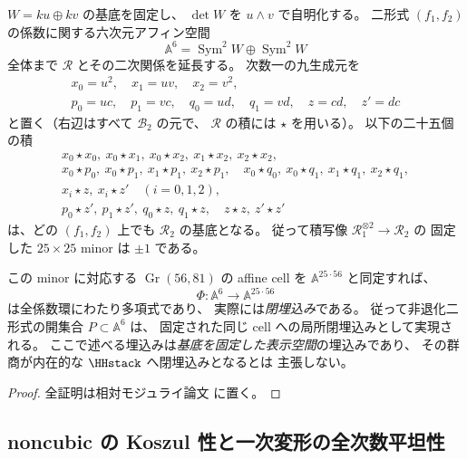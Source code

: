 \begin{proposition}
\label{prop:noncubic-grassmann-explicit-cell}
$W=ku\oplus kv$ の基底を固定し、
$\det W$ を $u\wedge v$ で自明化する。
二形式 $(f_1,f_2)$ の係数に関する六次元アフィン空間
\[
 \mathbb A^6=\operatorname{Sym}^2W\oplus\operatorname{Sym}^2W
\]
全体まで $\mathcal R$ とその二次関係を延長する。
次数一の九生成元を
\[
 \begin{gathered}
 x_0=u^2,\quad x_1=uv,\quad x_2=v^2,\\
 p_0=uc,\quad p_1=vc,\quad q_0=ud,\quad q_1=vd,\quad z=cd,\quad z'=dc
 \end{gathered}
 \tag{NC-9}\label{eq:noncubic-nine-generators}
\]
と置く（右辺はすべて $\mathcal B_2$ の元で、
$\mathcal R$ の積には $\star$ を用いる）。
以下の二十五個の積
\[
\begin{gathered}
 x_0\star x_0,\ x_0\star x_1,\ x_0\star x_2,\
 x_1\star x_2,\ x_2\star x_2,\\
 x_0\star p_0,\ x_0\star p_1,\
 x_1\star p_1,\ x_2\star p_1,\quad
 x_0\star q_0,\ x_0\star q_1,\
 x_1\star q_1,\ x_2\star q_1,\\
 x_i\star z,\ x_i\star z'\quad(i=0,1,2),\\
 p_0\star z',\ p_1\star z',\
 q_0\star z,\ q_1\star z,\quad
 z\star z,\ z'\star z'
\end{gathered}
\tag{NC-25}\label{eq:noncubic-25-pivots}
\]
は、どの $(f_1,f_2)$ 上でも $\mathcal R_2$ の基底となる。
従って積写像 $\mathcal R_1^{\otimes2}\to\mathcal R_2$ の
固定した $25\times25$ minor は $\pm1$ である。

この minor に対応する
$\operatorname{Gr}(56,81)$ の affine cell を
$\mathbb A^{25\cdot56}$ と同定すれば、
\[
 \Phi:\mathbb A^6\longrightarrow\mathbb A^{25\cdot56}
 \tag{NC-cell}\label{eq:noncubic-cell-map}
\]
は全係数環にわたり多項式であり、
実際には\emph{閉埋込み}である。
従って非退化二形式の開集合 $P\subset\mathbb A^6$ は、
固定された同じ cell への局所閉埋込みとして実現される。
ここで述べる埋込みは\emph{基底を固定した表示空間}の埋込みであり、
その群商が内在的な $\HHstack$ へ閉埋込みとなるとは
主張しない。
\end{proposition}
\begin{proof}
全証明は相対モジュライ論文 \cite[\texttt{noncubic_stack}]{QuadricModuli2026} に置く。
\end{proof}

\subsection{noncubic の Koszul 性と一次変形の全次数平坦性}
\label{subsec:noncubic-koszul-infinitesimal}

